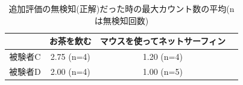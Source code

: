 \begin{table}[htbp]
  \caption{追加評価の無検知(正解)だった時の最大カウント数の平均(nは無検知回数)}
  \label{tb:additional_detection_count}
  \begin{center}
    \begin{tabular}{|c||c|c|c|}
      \hline
       & お茶を飲む  & マウスを使ってネットサーフィン \\
      \hline\hline
      被験者C & 2.75 (n=4) & 1.20 (n=4) \\\hline
      被験者D & 2.00  (n=4) & 1.00 (n=5) \\\hline
    \end{tabular}
  \end{center}
\end{table}



